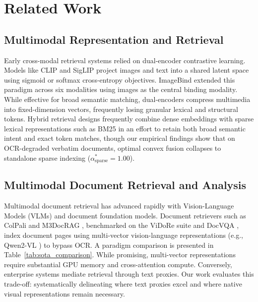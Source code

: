 \section{Related Work}
\label{sec:related_work}

\subsection{Multimodal Representation and Retrieval}
Early cross-modal retrieval systems relied on dual-encoder contrastive learning. Models like CLIP \cite{radford2021clip} and SigLIP \cite{zhai2023siglip} project images and text into a shared latent space using sigmoid or softmax cross-entropy objectives. ImageBind \cite{girdhar2023imagebind} extended this paradigm across six modalities using images as the central binding modality. While effective for broad semantic matching, dual-encoders compress multimedia into fixed-dimension vectors, frequently losing granular lexical and structural tokens. Hybrid retrieval designs frequently combine dense embeddings with sparse lexical representations such as BM25 \cite{robertson2009bm25, robertson1995okapi} in an effort to retain both broad semantic intent and exact token matches, though our empirical findings show that on OCR-degraded verbatim documents, optimal convex fusion collapses to standalone sparse indexing ($\alpha_{\text{sparse}}^* = 1.00$).

\subsection{Multimodal Document Retrieval and Analysis}
Multimodal document retrieval has advanced rapidly with Vision-Language Models (VLMs) and document foundation models. Document retrievers such as ColPali \cite{faysse2024colpali} and M3DocRAG \cite{cho2024m3docrag}, benchmarked on the ViDoRe suite \cite{faysse2024colpali} and DocVQA \cite{mathew2021docvqa}, index document pages using multi-vector vision-language representations (e.g., Qwen2-VL \cite{wang2024qwen2vl}) to bypass OCR. A paradigm comparison is presented in Table~\ref{tab:sota_comparison}. While promising, multi-vector representations require substantial GPU memory and cross-attention compute. Conversely, enterprise systems \cite{patel2025multimodal, joshi2024multimodel} mediate retrieval through text proxies. Our work evaluates this trade-off: systematically delineating where text proxies excel and where native visual representations remain necessary.



